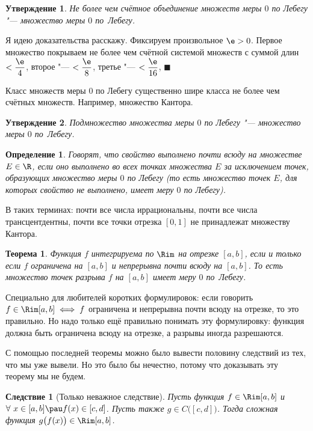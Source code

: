 \documentclass[a4paper,10pt,twoside]{article}
\newtheorem{Def}{Определение}[section]
\newtheorem{The}{Теорема}[section]
\newtheorem{Sl}{Следствие}[section]
\newtheorem{Ut}{Утверждение}[section]
\newenvironment{Proof}
       {\par\noindent{\textbf{Доказательство.}}}
       {\hfill$\scriptstyle\blacksquare$}
\begin{document}
 \begin{Ut}
 	Не более чем счётное объединение множеств меры $0$ по Лебегу "--- множество меры $0$ по~Лебегу.
 \end{Ut}
 
 \begin{Proof}
 	Я идею доказательства расскажу. Фиксируем произвольное $\e>0$. Первое множество покрываем не более чем счётной системой множеств
 	с суммой длин $<\dfrac{\e}4$, второе "--- $<\dfrac{\e}8$, третье "--- $<\dfrac{\e}{16}$,\ldotst{} 
 \end{Proof}
 
 Класс множеств меры $0$ по Лебегу существенно шире класса не более чем счётных множеств. Например, множество Кантора.
 
 \begin{Ut}
 	Подмножество множества меры $0$ по Лебегу "--- множество меры $0$ по~Лебегу.
 \end{Ut}
 
 \begin{Def}\label{BEST}
 	Говорят, что свойство выполнено почти всюду на множестве $E\in\R$, если оно выполнено во всех точках множества $E$ за исключением
 	точек, образующих множество меры $0$ по Лебегу (то есть множество точек $E$, для которых свойство не выполнено, имеет меру $0$ по Лебегу).
 \end{Def}
 
 В таких терминах: почти все числа иррациональны, почти все числа трансцентдентны, почти все точки отрезка $[0,1]$ не принадлежат множеству Кантора.
 
 \begin{The}
 Функция $f$ интегрируема по $\Rim$ на отрезке $[a,b]$, если и только если $f$ ограничена на $[a,b]$ и непрерывна почти всюду на $[a,b]$.
 То есть множество точек разрыва $f$ на $[a,b]$ имеет меру $0$ по~Лебегу.
 \end{The}
 
 Специально для любителей коротких формулировок: если говорить $f\in\Rim[a,b]\iff f$ ограничена и непрерывна почти всюду на отрезке, то это правильно.
 Но надо только ещё правильно понимать эту формулировку: функция должна быть ограничена всюду на отрезке, а разрывы иногда разрешаются.
 
 С помощью последней теоремы можно было вывести половину следствий из тех, что мы уже вывели. Но это было бы нечестно, потому что доказывать эту теорему
 мы не будем.
 
 \begin{Sl}[Только неважное следствие]
 	Пусть функция $f\in\Rim[a,b]$ и $\forall\  x\in[a,b]\pau f(x)\in[c,d]$. Пусть также $g\in C\big([c,d]\big)$. Тогда сложная функция $g\big(f(x)\big)\in\Rim[a,b]$.
 \end{Sl}
 
\end{document}

